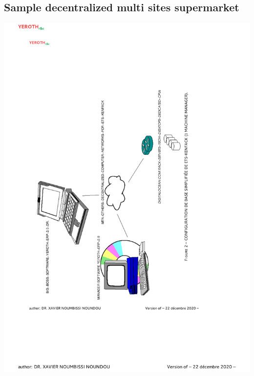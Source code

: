 \newpage

\subsection{Sample decentralized multi sites supermarket}

\begin{center}
\includegraphics[scale=0.81]{images/yeroth-sample-decentralized-multi-sites-supermarket.pdf}
\label{fig:sample-decentralized-multi-sites-supermarket}
\end{center}
